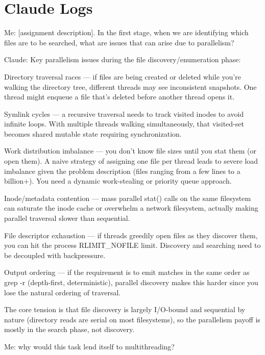 \documentclass[letterpaper,twocolumn,10pt]{article}
\begin{document}
% 
% 
\printbibliography{}

\section*{Claude Logs}

Me: [assignment description]. In the first stage, when we are identifying which files are to be searched, what are issues that can arise due to parallelism?

Claude: Key parallelism issues during the file discovery/enumeration phase:

Directory traversal races --- if files are being created or deleted while you're walking the directory tree, different threads may see inconsistent snapshots. One thread might enqueue a file that's deleted before another thread opens it.

Symlink cycles --- a recursive traversal needs to track visited inodes to avoid infinite loops. With multiple threads walking simultaneously, that visited-set becomes shared mutable state requiring synchronization.

Work distribution imbalance --- you don't know file sizes until you stat them (or open them). A naive strategy of assigning one file per thread leads to severe load imbalance given the problem description (files ranging from a few lines to a billion+). You need a dynamic work-stealing or priority queue approach.

Inode/metadata contention --- mass parallel stat() calls on the same filesystem can saturate the inode cache or overwhelm a network filesystem, actually making parallel traversal slower than sequential.

File descriptor exhaustion --- if threads greedily open files as they discover them, you can hit the process RLIMIT\_NOFILE limit. Discovery and searching need to be decoupled with backpressure.

Output ordering --- if the requirement is to emit matches in the same order as grep -r (depth-first, deterministic), parallel discovery makes this harder since you lose the natural ordering of traversal.

The core tension is that file discovery is largely I/O-bound and sequential by nature (directory reads are serial on most filesystems), so the parallelism payoff is mostly in the search phase, not discovery.

Me: why would this task lend itself to multithreading?
\end{document}

